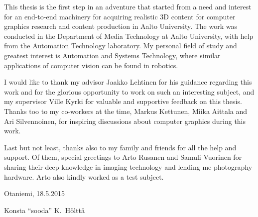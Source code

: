 This thesis is the first step in an adventure that started from a need and interest for an end-to-end machinery for acquiring realistic 3D content for computer graphics research and content production in Aalto University.
The work was conducted in the Department of Media Technology at Aalto University, with help from the Automation Technology laboratory.
My personal field of study and greatest interest is Automation and Systems Technology, where similar applications of computer vision can be found in robotics.

I would like to thank my advisor Jaakko Lehtinen for his guidance regarding this work and for the glorious opportunity to work on such an interesting subject, and my supervisor Ville Kyrki for valuable and supportive feedback on this thesis.
Thanks too to my co-workers at the time, Markus Kettunen, Miika Aittala and Ari Silvennoinen, for inspiring discussions about computer graphics during this work.

Last but not least, thanks also to my family and friends for all the help and support.
Of them, special greetings to Arto Rusanen and Samuli Vuorinen for sharing their deep knowledge in imaging technology and lending me photography hardware.
Arto also kindly worked as a test subject.

\vspace{5cm}
Otaniemi, 18.5.2015

\vspace{5mm}
{\hfill Konsta ``sooda'' K.\ Hölttä \hspace{1cm}}
